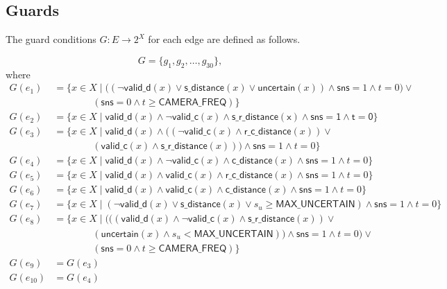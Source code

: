 \documentclass[12pt]{article}
\theoremstyle{definition}
\begin{document}
\subsection{Guards}

The guard conditions $G: E \to 2^{X}$ for each edge are defined as follows.

\[
G = \{ g_1, g_2, \dots, g_{30} \},
\]
where
\[
\begin{aligned}
G(e_1)  &= \{x \in X \mid \big((\neg \mathsf{valid\_d}(x) \lor \mathsf{s\_distance}(x) \lor \mathsf{uncertain}(x)) \land \mathsf{sns} = 1 \land t = 0\big) \lor \\
&\qquad\qquad(\mathsf{sns} = 0 \land t \ge \mathsf{CAMERA\_FREQ})\} \\
G(e_2)  &= \{x \in X \mid \mathsf{valid\_d}(x) \land \neg \mathsf{valid\_c}(x) \land \mathsf{s\_r\_distance(x) \land \mathsf{sns} = 1 \land t = 0}\} \\
G(e_3)  &= \{x \in X \mid \mathsf{valid\_d}(x) \land \big((\neg \mathsf{valid\_c}(x) \land \mathsf{r\_c\_distance}(x)) \lor \\ 
&\qquad\qquad(\mathsf{valid\_c}(x) \land \mathsf{s\_r\_distance}(x))\big) \land \mathsf{sns} = 1 \land t = 0 \} \\
G(e_4)  &= \{x \in X \mid \mathsf{valid\_d}(x) \land \neg \mathsf{valid\_c}(x) \land \mathsf{c\_distance}(x) \land \mathsf{sns} = 1 \land t = 0 \} \\
G(e_5)  &= \{x \in X \mid \mathsf{valid\_d}(x) \land \mathsf{valid\_c}(x) \land \mathsf{r\_c\_distance}(x) \land \mathsf{sns} = 1 \land t = 0\} \\
G(e_6)  &= \{x \in X \mid \mathsf{valid\_d}(x) \land \mathsf{valid\_c}(x) \land \mathsf{c\_distance}(x) \land \mathsf{sns} = 1 \land t = 0\} \\
G(e_7)  &= \{x \in X \mid (\neg \mathsf{valid\_d}(x) \lor \mathsf{s\_distance}(x) \lor s_u \ge \mathsf{MAX\_UNCERTAIN}) \land \mathsf{sns} = 1 \land t = 0 \} \\
G(e_8)  &= \{x \in X \mid \big(((\mathsf{valid\_d}(x) \land \neg \mathsf{valid\_c}(x) \land \mathsf{s\_r\_distance}(x)) \lor  \\ 
&\qquad\qquad(\mathsf{uncertain}(x) \land s_u < \mathsf{MAX\_UNCERTAIN})) \land \mathsf{sns} = 1 \land t = 0 \big) \lor \\ 
&\qquad\qquad(\mathsf{sns} = 0 \land t \ge \mathsf{CAMERA\_FREQ}) \} \\
G(e_9) &= G(e_3) \\ 
G(e_{10}) &= G(e_4) \\

\end{aligned}\]
\end{document}
